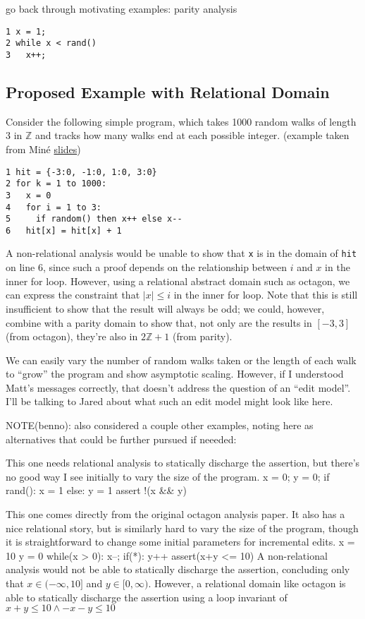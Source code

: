 \documentclass[acmlarge,anonymous]{acmart}\settopmatter{printfolios=true}
\begin{document}
go back through motivating examples: parity analysis

\begin{lstlisting}
1 x = 1;
2 while x < rand()
3   x++;
\end{lstlisting}


\subsection{Proposed Example with Relational Domain}

Consider the following simple program, which takes 1000 random walks of length 3 in $\mathbb{Z}$ and tracks how many walks end at each possible integer. (example taken from Min\'e \href{https://pdfs.semanticscholar.org/ccb9/2bfe24199455d7c4a430f756c915cd4e5ae8.pdf}{slides})
\begin{lstlisting}
1 hit = {-3:0, -1:0, 1:0, 3:0}
2 for k = 1 to 1000:
3   x = 0
4   for i = 1 to 3:
5     if random() then x++ else x--
6   hit[x] = hit[x] + 1
\end{lstlisting}

A non-relational analysis would be unable to show that \texttt{x} is in the domain of \texttt{hit} on line 6, since such a proof depends on the relationship between $i$ and $x$ in the inner for loop.  However,  using a relational abstract domain such as octagon, we can express the constraint that $|x|\leq i$ in the inner for loop.  Note that this is still insufficient to show that the result will always be odd; we could, however, combine with a parity domain to show that, not only are the results in $[-3,3]$ (from octagon), they're also in $2\mathbb{Z}+1$ (from parity).

We can easily vary the number of random walks taken or the length of each walk to ``grow'' the program and show asymptotic scaling.  However, if I understood Matt's messages correctly, that doesn't address the question of an ``edit model''.  I'll be talking to Jared about what such an edit model might look like here.

\iffalse NOTE(benno): also considered a couple other examples, noting here as alternatives that could be further pursued if neeeded:

This one needs relational analysis to statically discharge the assertion, but there's no good way I see initially to vary the size of the program.
  x = 0;
  y = 0;
  if rand():
    x = 1
  else:
    y = 1
    assert !(x && y)

This one comes directly from the original octagon analysis paper.  It also has a nice relational story, but is similarly hard to vary the size of the program, though it is straightforward to change some initial parameters for incremental edits.
    x = 10
    y = 0
    while(x > 0):
      x--;
      if(*):
        y++
    assert(x+y <= 10)  
A non-relational analysis would not be able to statically discharge the assertion, concluding only that $x\in (-\infty,10]$ and $y\in [0,\infty)$.  However, a relational domain like octagon is able to statically discharge the assertion using a loop invariant of $x+y\leq10\wedge-x-y\leq10$
\end{document}
